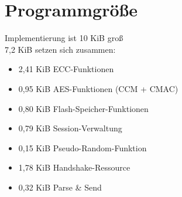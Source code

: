 \section{Programmgröße}

Implementierung ist 10 KiB groß\\
7,2 KiB setzen sich zusammen: 
\begin{itemize}
  \item 2,41 KiB ECC-Funktionen
  \item 0,95 KiB AES-Funktionen (CCM + CMAC)
  \item 0,80 KiB Flash-Speicher-Funktionen
  \item 0,79 KiB Session-Verwaltung
  \item 0,15 KiB Pseudo-Random-Funktion
  \item 1,78 KiB Handshake-Ressource
  \item 0,32 KiB Parse \& Send
\end{itemize}